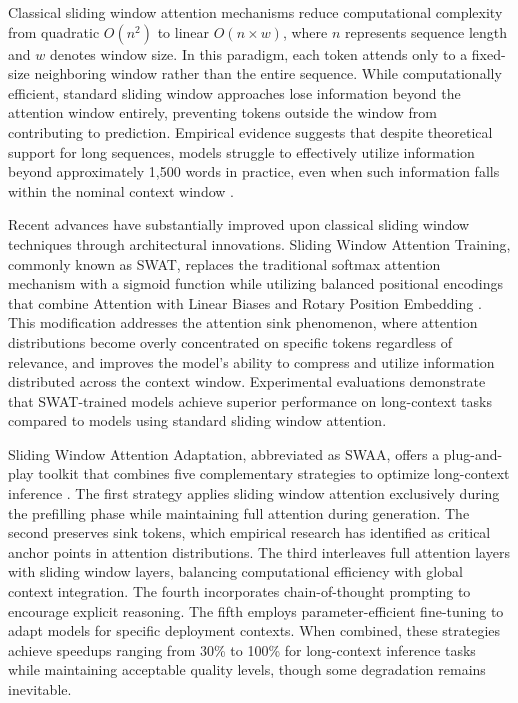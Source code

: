 Classical sliding window attention mechanisms reduce computational complexity from quadratic $O(n^2)$ to linear $O(n \times w)$, where $n$ represents sequence length and $w$ denotes window size. In this paradigm, each token attends only to a fixed-size neighboring window rather than the entire sequence. While computationally efficient, standard sliding window approaches lose information beyond the attention window entirely, preventing tokens outside the window from contributing to prediction. Empirical evidence suggests that despite theoretical support for long sequences, models struggle to effectively utilize information beyond approximately 1,500 words in practice, even when such information falls within the nominal context window \citep{press2022train}.

Recent advances have substantially improved upon classical sliding window techniques through architectural innovations. Sliding Window Attention Training, commonly known as SWAT, replaces the traditional softmax attention mechanism with a sigmoid function while utilizing balanced positional encodings that combine Attention with Linear Biases and Rotary Position Embedding \citep{chen2025swat}. This modification addresses the attention sink phenomenon, where attention distributions become overly concentrated on specific tokens regardless of relevance, and improves the model's ability to compress and utilize information distributed across the context window. Experimental evaluations demonstrate that SWAT-trained models achieve superior performance on long-context tasks compared to models using standard sliding window attention.

Sliding Window Attention Adaptation, abbreviated as SWAA, offers a plug-and-play toolkit that combines five complementary strategies to optimize long-context inference \citep{zhang2024swaa}. The first strategy applies sliding window attention exclusively during the prefilling phase while maintaining full attention during generation. The second preserves sink tokens, which empirical research has identified as critical anchor points in attention distributions. The third interleaves full attention layers with sliding window layers, balancing computational efficiency with global context integration. The fourth incorporates chain-of-thought prompting to encourage explicit reasoning. The fifth employs parameter-efficient fine-tuning to adapt models for specific deployment contexts. When combined, these strategies achieve speedups ranging from 30\% to 100\% for long-context inference tasks while maintaining acceptable quality levels, though some degradation remains inevitable.

